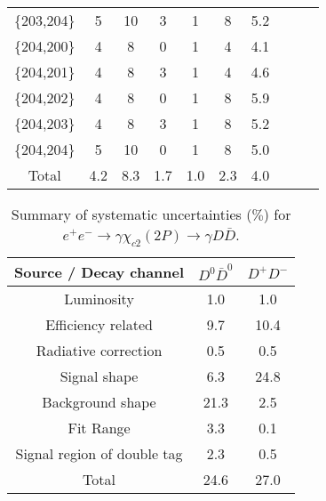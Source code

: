 \documentclass[aps,preprint,tightenlines,superscriptaddress,showpacs,byrevtex,amsmath,amssymb,nofloatfix]{revtex4}
\begin{document}
\begin{table}[!htbp]
\begin{tabular}{c c c c c c c c c c}
     \{203,204\}   &5    &10     &3   &1   &8   &5.2        \\
     \{204,200\}   &4    &8      &0   &1   &4   &4.1        \\
     \{204,201\}   &4    &8      &3   &1   &4   &4.6        \\
     \{204,202\}   &4    &8      &0   &1   &8   &5.9        \\
     \{204,203\}   &4    &8      &3   &1   &8   &5.2        \\
     \{204,204\}   &5    &10     &0   &1   &8   &5.0        \\
     \hline
     Total         &4.2     &8.3       &1.7    &1.0    &2.3    &4.0            \\
    \hline \hline
\end{tabular}
\end{table}

\begin{table}[!htbp]
\caption{\small Summary of systematic uncertainties ($\%$) for $e^{+}e^{-}\rightarrow \gamma \chi_{c2} (2P)\rightarrow \gamma D\bar{D}$.}
\label{sys_err_gamDD}
\begin{tabular}{c| c |c }
\hline
     Source / Decay channel     & $D^{0}\bar{D}^{0}$ &  $D^{+}D^{-}$    \\
    \hline
    Luminosity                       &1.0    &1.0      \\
    Efficiency related               &9.7	 &10.4	  	\\
    Radiative correction             &0.5    &0.5      \\
    Signal shape                      &6.3    &24.8         \\
    Background shape                 &21.3   &2.5         \\
    Fit Range                        &3.3    &0.1         \\
    Signal region of double tag      &2.3    &0.5         \\
    \hline
    Total                            &24.6   &27.0      \\
    \hline
    \hline
\end{tabular}
\end{table}
\end{document}
